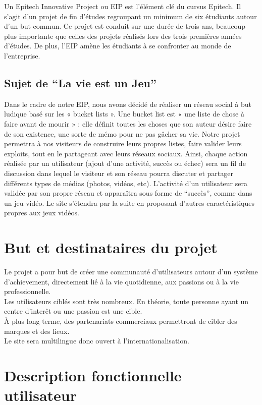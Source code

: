\documentclass{life-fr}
\begin{document}
Un Epitech Innovative Project ou EIP est l'élément clé du cursus Epitech. Il s'agit d'un projet de fin d'études regroupant un minimum de six étudiants autour d'un but commun. Ce projet est conduit sur une durée de trois ans, beaucoup plus importante que celles des projets réalisés lors des trois premières années d'études. De plus, l'EIP amène les étudiants à se confronter au monde de l'entreprise.

\section{Sujet de ``La vie est un Jeu''}
Dans le cadre de notre EIP, nous avons décidé de réaliser un réseau social à but ludique basé sur les « bucket lists ». Une bucket list est « une liste de chose à faire avant de mourir » : elle définit toutes les choses que son auteur désire faire de son existence, une sorte de mémo pour ne pas gâcher sa vie. Notre projet permettra à nos visiteurs de construire leurs propres listes, faire valider leurs exploits, tout en le partageant avec leurs réseaux sociaux. Ainsi, chaque action réalisée par un utilisateur (ajout d'une activité, succès ou échec) sera un fil de discussion dans lequel le visiteur et son réseau pourra discuter et partager différents types de médias (photos, vidéos, etc). L'activité d'un utilisateur sera validée par son propre réseau et apparaîtra sous forme de “succès”, comme dans un jeu vidéo. Le site s'étendra par la suite en proposant d'autres caractéristiques propres aux jeux vidéos.

\chapter{But et destinataires du projet}

Le projet a pour but de créer une communauté d'utilisateurs autour d'un système d'achievement, directement lié à la vie quotidienne, aux passions ou à la vie professionnelle.\\

Les utilisateurs ciblés sont très nombreux. En théorie, toute personne ayant un centre d'interêt ou une passion est une cible.\\

À plus long terme, des partenariats commerciaux permettront de cibler des marques et des lieux.\\

Le site sera multilingue donc ouvert à l'internationalisation.

\chapter{Description fonctionnelle utilisateur}
\end{document}
